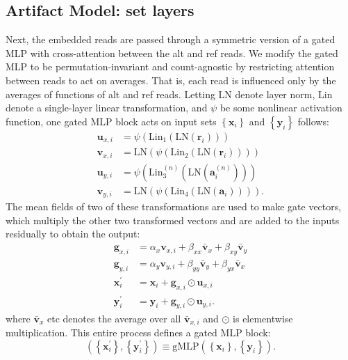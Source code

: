 \documentclass[times, twoside, watermark]{StyleBioRxiv}
\begin{document}
\subsection*{Artifact Model: set layers} 
Next, the embedded reads are passed through a symmetric version of a gated MLP\cite{gated-mlp} with cross-attention between the alt and ref reads.  We modify the gated MLP to be permutation-invariant and count-agnostic by restricting attention between reads to act on averages.  That is, each read is influenced only by the averages of functions of alt and ref reads.  Letting $\mathrm{LN}$ denote layer norm, $\mathrm{Lin}$ denote a single-layer linear transformation, and $\psi$ be some nonlinear activation function, one gated MLP block acts on input sets $\left\{ \mathbf{x}_i  \right\}$ and $\left\{ \mathbf{y}_i  \right\}$ follows:  
\begin{align}
    \mathbf{u}_{x,i} &= \psi(\mathrm{Lin}_1(\mathrm{LN}(\mathbf{r}_i))) \\
    \mathbf{v}_{x,i} &= \mathrm{LN}(\psi(\mathrm{Lin}_2(\mathrm{LN}(\mathbf{r}_i)))) \\
    \mathbf{u}_{y,i} &= \psi(\mathrm{Lin}_3^{(n)}(\mathrm{LN}(\mathbf{a}_i^{(n)}))) \\
    \mathbf{v}_{y,i} &= \mathrm{LN}(\psi(\mathrm{Lin}_4(\mathrm{LN}(\mathbf{a}_i)))).
\end{align}
The mean fields of two of these transformations are used to make gate vectors, which multiply the other two transformed vectors and are added to the inputs residually to obtain the output:
\begin{align}
    \mathbf{g}_{x,i} &= \alpha_x \mathbf{v}_{x,i} + 
    \beta_{xx} \mathbf{\bar{v}}_{x} +
    \beta_{xy} \mathbf{\bar{v}}_{y} \\
    \mathbf{g}_{y,i} &= \alpha_y \mathbf{v}_{y,i} + 
    \beta_{yy} \mathbf{\bar{v}}_{y} +
    \beta_{yx} \mathbf{\bar{v}}_{x} \\
    \mathbf{x}_i^\prime &= \mathbf{x}_i + \mathbf{g}_{x,i} \odot \mathbf{u}_{x,i} \\
    \mathbf{y}_i^\prime &= \mathbf{y}_i + \mathbf{g}_{y,i} \odot \mathbf{u}_{y,i}.
\end{align}
where $\mathbf{\bar{v}}_{x}$ etc denotes the average over all $\mathbf{\bar{v}}_{x,i}$ and $\odot$ is elementwise multiplication.  This entire process defines a gated MLP block:
\begin{equation}
    \left( \left\{ \mathbf{x}_i^\prime  \right\}, \left\{ \mathbf{y}_i^\prime  \right\} \right) \equiv \mathrm{gMLP} \left( \left\{ \mathbf{x}_i  \right\}, \left\{ \mathbf{y}_i \right\} \right).
\end{equation}
\end{document}
